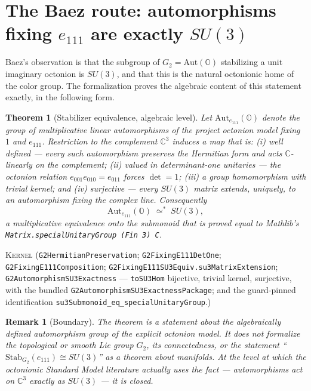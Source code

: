 \documentclass[11pt]{article}
\newcommand{\C}{\mathbb{C}}
\newcommand{\OO}{\mathbb{O}}
\newcommand{\Kernel}{\textcolor{kernelcolor}{\textsc{Kernel}}}
\newcommand{\leanname}[1]{\texttt{#1}}
\newtheorem{theorem}{Theorem}
\newtheorem{remark}{Remark}
\begin{document}
\section{The Baez route: automorphisms fixing $e_{111}$ are exactly $SU(3)$}
\label{sec:baez}

Baez's observation \cite{Baez2021} is that the subgroup of $G_2 =
\mathrm{Aut}(\OO)$ stabilizing a unit imaginary octonion is $SU(3)$, and
that this is the natural octonionic home of the color group.  The
formalization proves the algebraic content of this statement exactly,
in the following form.

\begin{theorem}[Stabilizer equivalence, algebraic level]
\label{thm:su3}
Let $\mathrm{Aut}_{e_{111}}(\OO)$ denote the group of multiplicative
linear automorphisms of the project octonion model fixing $1$ and
$e_{111}$.  Restriction to the complement $\C^3$ induces a map that is:
(i) well defined --- every such automorphism preserves the Hermitian form
and acts $\C$-linearly on the complement; (ii) valued in determinant-one
unitaries --- the octonion relation $e_{001}e_{010} = e_{011}$ forces
$\det = 1$; (iii) a group homomorphism with trivial kernel; and (iv)
surjective --- every $SU(3)$ matrix extends, uniquely, to an automorphism
fixing the complex line.  Consequently
\[
\mathrm{Aut}_{e_{111}}(\OO) \;\simeq^*\; SU(3),
\]
a multiplicative equivalence onto the submonoid that is proved
\emph{equal} to Mathlib's
\leanname{Matrix.specialUnitaryGroup (Fin 3) C}.
\end{theorem}
\noindent\Kernel{}\quad
(\leanname{G2HermitianPreservation};
\leanname{G2FixingE111DetOne};
\leanname{G2FixingE111Composition};
\leanname{G2FixingE111SU3Equiv.su3MatrixExtension};
\leanname{G2AutomorphismSU3Exactness} ---
\leanname{toSU3Hom} bijective, trivial kernel, surjective, with the
bundled \leanname{G2AutomorphismSU3ExactnessPackage}; and the
guard-pinned identification
\leanname{su3Submonoid\_eq\_specialUnitaryGroup}.)

\begin{remark}[Boundary]
The theorem is a statement about the algebraically defined automorphism
group of the explicit octonion model.  It does not formalize the
topological or smooth Lie group $G_2$, its connectedness, or the
statement ``$\mathrm{Stab}_{G_2}(e_{111}) \cong SU(3)$'' as a theorem
about manifolds.  At the level at which the octonionic Standard Model
literature actually uses the fact --- automorphisms act on
$\C^3$ exactly as $SU(3)$ --- it is closed.
\end{remark}
\end{document}
